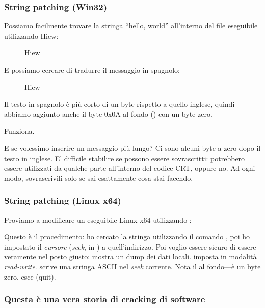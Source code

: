 \subsubsection{String patching (Win32)}

Possiamo facilmente trovare la stringa ``hello, world'' all'interno del file eseguibile utilizzando Hiew:

\begin{figure}[H]
\centering
{}
\caption{Hiew}
\label{}
\end{figure}

E possiamo cercare di tradurre il messaggio in spagnolo:

\begin{figure}[H]
\centering
{}
\caption{Hiew}
\label{}
\end{figure}

Il testo in spagnolo è più corto di un byte rispetto a quello inglese, quindi abbiamo aggiunto anche il byte 0x0A al fondo () con un byte zero.

Funziona.

E se volessimo inserire un messaggio più lungo?
Ci sono alcuni byte a zero dopo il testo in inglese.
E' difficile stabilire se possono essere sovrascritti: potrebbero essere utilizzati da qualche parte all'interno del codice \ac{CRT}, oppure no.
Ad ogni modo, sovrascrivili solo se sai esattamente cosa stai facendo.

\subsubsection{String patching (Linux x64)}

\myindex{\radare}
Proviamo a modificare un eseguibile Linux x64 utilizzando \radare{}:



Questo è il procedimento: ho cercato la stringa  utilizzando il comando \TT{/},
poi ho impostato il \emph{cursore} (\emph{seek}, in \radare{}) a quell'indirizzo.
Poi voglio essere sicuro di essere veramente nel posto giusto:  mostra un dump dei dati locali.
 imposta \radare{} in modalità \emph{read-write}.
 scrive una stringa ASCII nel \emph{seek} corrente.
Nota il  al fondo---è un byte zero.
 esce (quit).


\subsubsection{Questa è una vera storia di cracking di software}
\myindex{\SoftwareCracking}

